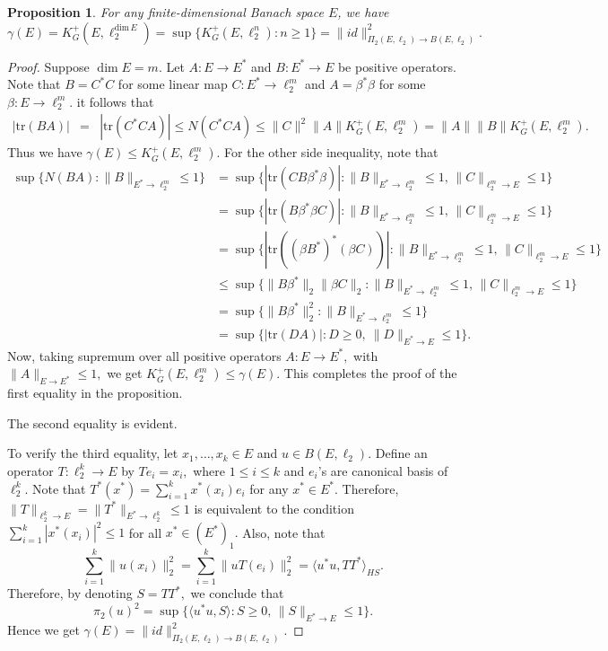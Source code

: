 \documentclass[a4paper,oneside,11pt, reqno]{amsart}
\numberwithin{equation}{section}
\newtheorem{proposition}[theorem]{Proposition}
\theoremstyle{plain}
\begin{document}
\begin{proposition} \label{++++}
For any finite-dimensional Banach space $E$, we have \[\gamma(E)=K_G^+(E,\ell_2^{\text{dim}\,E})=\sup\{K_G^+(E,\ell_2^n):n\geqslant 1\}=\|id\|^2_{\Pi_2(E,\ell_2)\to B(E,\ell_2)}.\]
\end{proposition}
\begin{proof}
Suppose $\dim E=m.$  Let $A:E\to E^*$ and $B:E^*\to E$ be positive operators. Note that $B=C^*C$ for some linear map $C:E^*\to \ell_2^m$ and $A=\beta^*\beta$ for some $\beta:E\to\ell_2^m.$ it follows that 
\begin{eqnarray*}
|\text{tr}(BA)| &=& |\text{tr}(C^*CA)|\leqslant  N(C^*CA)\leqslant  %
\|C\|^2 \|A\| K_G^+(E,\ell_2^m)=\|A\| \|B\| K_G^+(E,\ell_2^m).
\end{eqnarray*}
Thus we have $\gamma(E)\leqslant K_G^+(E,\ell_2^m).$
For the other side inequality, %
note that
\begin{align*}
\sup\big \{N(BA):\|B\|_{E^*\to \ell_2^m}\leqslant 1 \big\}&= \sup\big \{ |\text{tr}(CB\beta^*\beta)| : \|B\|_{E^*\to \ell_2^m}\leqslant 1,\, \|C\|_{\ell_2^m \to E}\leqslant 1 \big \}\\
&=\sup\big \{  |\text{tr}(B\beta^*\beta C)|  : \|B\|_{E^*\to \ell_2^m}\leqslant 1,\, \|C\|_{\ell_2^m \to E}\leqslant 1 \big \}\\
&=  \sup\big \{ |\text{tr}((\beta B^*)^*(\beta C))| : \|B\|_{E^*\to \ell_2^m}\leqslant 1,\, \|C\|_{\ell_2^m \to E}\leqslant 1 \big \}\\ 
&\leqslant   \sup\big \{  \|B\beta^*\|_2\|\beta C\|_2 : \|B\|_{E^*\to \ell_2^m}\leqslant 1,\, \|C\|_{\ell_2^m \to E}\leqslant 1 \big \}\\ 
&=\sup \big \{\|B\beta^*\|_2^2 :\|B\|_{E^*\to \ell_2^m}\leqslant 1\big\}\\
&= \sup\{|\text{tr}(DA)|: D\geqslant 0,\ \|D\|_{E^* \to E}\leqslant 1\}.
\end{align*} 
Now, taking supremum over all positive operators $A:E\to E^*,$ with $\|A\|_{E\to E^*}\leq 1,$ we get $K_G^+(E,\ell_2^m)\leqslant \gamma(E).$ This completes the proof of the first equality in the proposition. 

 The second equality is evident.

To verify the third equality, let $x_1,\dots,x_k\in E$ and $u\in B(E,\ell_2).$ Define an operator $T:\ell_2^k\to E$ by $Te_i=x_i,$ where $1\leqslant i\leqslant k$ and $e_i$'s are canonical basis of $\ell_2^k$. Note that $T^*(x^*)=\sum_{i=1}^kx^*(x_i)e_i$ for any $x^*\in E^*.$ 
Therefore, $\|T\|_{\ell_2^k\to E}=\|T^*\|_{E^*\to\ell_2^k}\leqslant 1$ is equivalent to the condition $\sum_{i=1}^k|x^*(x_i)|^2\leqslant 1$ for all $x^*\in (E^*)_1.$  
Also, note that \[\sum_{i=1}^k\|u(x_i)\|_{2}^2=\sum_{i=1}^k\|uT(e_i)\|_{2}^2=\langle u^*u, TT^*\rangle_{HS}.\] 
Therefore, by denoting $S=TT^*,$ we conclude that 
\[\pi_2(u)^2=\sup\big\{\langle u^*u, S\rangle: S\geqslant 0,\, \|S\|_{E^*\to E}\leqslant 1\big\}.\] 
Hence we get $\gamma(E)=\|id\|^2_{\Pi_2(E,\ell_2)\to B(E,\ell_2)}.$
\end{proof}
\end{document}
